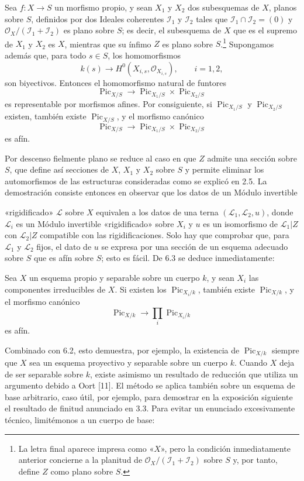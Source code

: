  Sea $f:X\longrightarrow S$ un morfismo propio, y sean
$X_1$ y $X_2$ dos subesquemas de $X$, planos sobre $S$, definidos por dos
Ideales coherentes $\mathcal I_1$ y $\mathcal I_2$ tales que
$\mathcal I_1\cap\mathcal I_2=(0)$ y
$\mathcal O_X/(\mathcal I_1+\mathcal I_2)$ es plano sobre $S$; es decir, el
subesquema de $X$ que es el supremo de $X_1$ y $X_2$ es $X$, mientras que su
ínfimo $Z$ es plano sobre $S$.\footnote{La letra final aparece impresa como
«$X$», pero la condición inmediatamente anterior concierne a la planitud de
$\mathcal O_X/(\mathcal I_1+\mathcal I_2)$ sobre $S$ y, por tanto, define $Z$
como plano sobre $S$.} Supongamos además que, para todo $s\in S$, los
homomorfismos
\[
k(s)\longrightarrow H^0(X_{i,s},\mathcal O_{X_{i,s}}),\qquad i=1,2,
\]
son biyectivos. Entonces el homomorfismo natural de funtores
\[
\operatorname{Pic}_{X/S}\longrightarrow
\operatorname{Pic}_{X_1/S}\times\operatorname{Pic}_{X_2/S}
\]
es representable por morfismos afines. Por consiguiente, si
$\operatorname{Pic}_{X_1/S}$ y $\operatorname{Pic}_{X_2/S}$ existen, también
existe $\operatorname{Pic}_{X/S}$, y el morfismo canónico
\[
\operatorname{Pic}_{X/S}\longrightarrow
\operatorname{Pic}_{X_1/S}\times\operatorname{Pic}_{X_2/S}
\]
es afín.

Por descenso fielmente plano se reduce al caso en que $Z$ admite una sección
sobre $S$, que define así secciones de $X$, $X_1$ y $X_2$ sobre $S$ y permite
eliminar los automorfismos de las estructuras consideradas como se explicó en
2.5. La demostración consiste entonces en observar que los datos de un Módulo
invertible

«rigidificado» $\mathcal L$ sobre $X$ equivalen a los datos de una terna
$(\mathcal L_1,\mathcal L_2,u)$, donde $\mathcal L_i$ es un Módulo invertible
«rigidificado» sobre $X_i$ y $u$ es un isomorfismo de $\mathcal L_1|Z$ con
$\mathcal L_2|Z$ compatible con las rigidificaciones. Solo hay que comprobar
que, para $\mathcal L_1$ y $\mathcal L_2$ fijos, el dato de $u$ se expresa por
una sección de un esquema adecuado sobre $S$ que es afín sobre $S$; esto es
fácil. De 6.3 se deduce inmediatamente:

 Sea $X$ un esquema propio y separable sobre un cuerpo
$k$, y sean $X_i$ las componentes irreducibles de $X$. Si existen los
$\operatorname{Pic}_{X_i/k}$, también existe $\operatorname{Pic}_{X/k}$, y el
morfismo canónico
\[
\operatorname{Pic}_{X/k}\longrightarrow\prod_i\operatorname{Pic}_{X_i/k}
\]
es afín.

Combinado con 6.2, esto demuestra, por ejemplo, la existencia de
$\operatorname{Pic}_{X/k}$ siempre que $X$ sea un esquema proyectivo y
separable sobre un cuerpo $k$. Cuando $X$ deja de ser separable sobre $k$,
existe asimismo un resultado de reducción que utiliza un argumento debido a
Oort [11]. El método se aplica también sobre un esquema de base arbitrario, caso
útil, por ejemplo, para demostrar en la exposición siguiente el resultado de
finitud anunciado en 3.3. Para evitar un enunciado excesivamente técnico,
limitémonos a un cuerpo de base:

